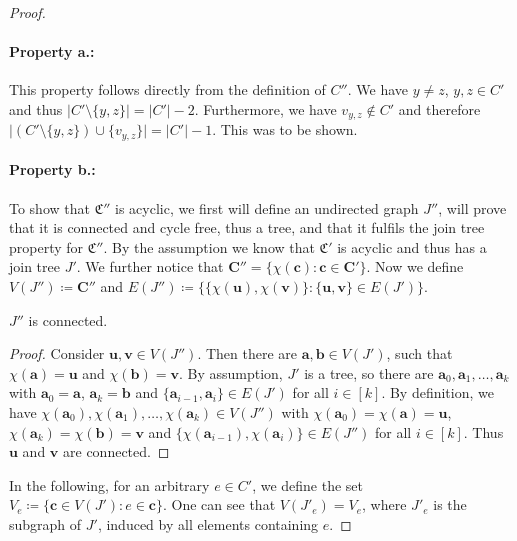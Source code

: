 \begin{proof}
	\paragraph{Property a.:}
	This property follows directly from the definition of $C''$.
	We have $y\neq z$, $y,z\in C'$ and thus $\vert C'\setminus \{y,z\}\vert = \vert C'\vert -2$.
	Furthermore, we have $v_{y,z}\notin C'$ and therefore $\vert (C'\setminus \{y,z\})\cup \{v_{y,z}\}\vert = \vert C' \vert -1$.
	This was to be shown.
	
	\paragraph{Property b.:}
	To show that $\mathfrak C''$ is acyclic, we first will define an undirected graph $J''$, will prove that it is connected and cycle free, thus a tree, and that it fulfils the join tree property for $\mathfrak C''$.
	By the assumption we know that $\mathfrak C'$ is acyclic and thus has a join tree $J'$.
	We further notice that $\mathbf{C''}=\{\chi(\mathbf c) : \mathbf c\in \mathbf{C'}\}$.
	Now we define $V(J'')\coloneqq \mathbf{C''}$ and $E(J'')\coloneqq \{\{\chi(\mathbf u),\chi(\mathbf v)\} : \{\mathbf u,\mathbf v\}\in E(J')\}$.
	
	\begin{claim}
		$J''$ is connected.
	\end{claim}
	\begin{proof}
		Consider $\mathbf u,\mathbf v\in V(J'')$.
		Then there are $\mathbf a,\mathbf b\in V(J')$, such that $\chi(\mathbf a)=\mathbf u$ and $\chi(\mathbf b)=\mathbf v$.
		By assumption, $J'$ is a tree, so there are $\mathbf a_0,\mathbf a_1,\dots,\mathbf a_k$ with $\mathbf a_0=\mathbf a$, $\mathbf a_k=\mathbf b$ and $\{\mathbf a_{i-1},\mathbf a_{i}\}\in E(J')$ for all $i\in [k]$.
		By definition, we have $\chi(\mathbf a_0),\chi(\mathbf a_1),\dots,\chi(\mathbf a_k)\in V(J'')$ with $\chi(\mathbf a_0)=\chi(\mathbf a)=\mathbf u$, $\chi(\mathbf a_k)=\chi(\mathbf b)=\mathbf v$ and $\{\chi(\mathbf a_{i-1}),\chi(\mathbf a_i)\}\in E(J'')$ for all $i\in[k]$.
		Thus $\mathbf u$ and $\mathbf v$ are connected.
	\end{proof}
	
	In the following, for an arbitrary $e \in C'$, we define the set $V_e\coloneqq \{\mathbf c\in V(J') : e\in \mathbf c\}$.
	One can see that $V(J'_e)=V_e$, where $J'_e$ is the subgraph of $J'$, induced by all elements containing $e$.
	

\end{proof}

